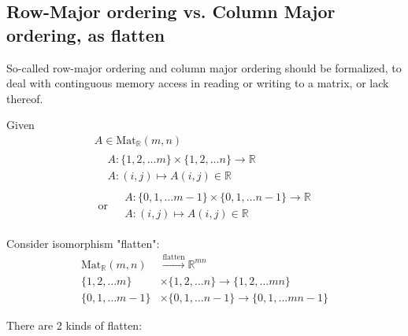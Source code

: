\documentclass[10pt]{amsart}
\begin{document}
\begin{multicols*}{2}
\section{Row-Major ordering vs. Column Major ordering, as flatten}

So-called row-major ordering and column major ordering should be formalized, to deal with continguous memory access in reading or writing to a matrix, or lack thereof.  

Given 
\[
\begin{gathered}
A \in \text{Mat}_{\mathbb{R}}(m,n) \\ 
\begin{aligned}
& A: \lbrace 1,2, \dots m \rbrace \times \lbrace 1,2, \dots n \rbrace \to \mathbb{R} \\
& A: (i,j) \mapsto A(i,j) \in \mathbb{R} 
\end{aligned} \\
\text{ or } 
\begin{aligned}
& A: \lbrace 0,1, \dots m-1 \rbrace \times \lbrace 0,1, \dots n-1 \rbrace \to \mathbb{R} \\
& A: (i,j) \mapsto A(i,j) \in \mathbb{R} 
\end{aligned} 
\end{gathered}
\]

Consider isomorphism "flatten":
\begin{equation}
\begin{aligned}
\text{Mat}_{\mathbb{R}}(m,n)  & \xrightarrow{\text{flatten} } \mathbb{R}^{mn} \\
\lbrace 1,2, \dots m \rbrace  & \times \lbrace 1,2, \dots n \rbrace \to \lbrace 1,2,\dots mn \rbrace \\
\lbrace 0,1, \dots m-1 \rbrace  & \times \lbrace 0,1, \dots n-1 \rbrace \to \lbrace 0,1,\dots mn-1 \rbrace
\end{aligned}
\end{equation}

There are 2 kinds of flatten:


\end{multicols*}
\end{document}
